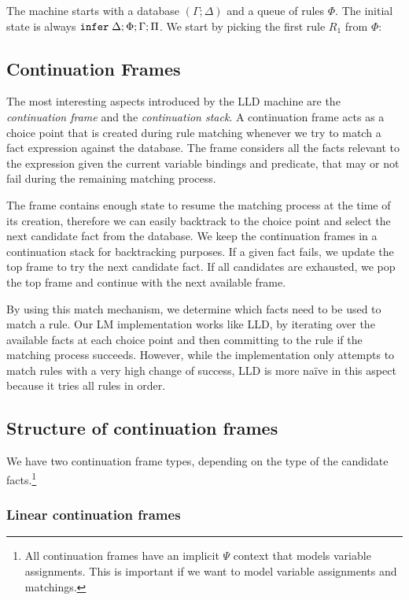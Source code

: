 The machine starts with a database $(\Gamma; \Delta)$ and a queue of rules
$\Phi$. The initial state is always $\mathtt{infer} \; \Delta; \Phi; \Gamma; \Pi$.
We start by picking the first rule $R_1$ from $\Phi$:



\subsection{Continuation Frames}

The most interesting aspects introduced by the LLD machine are the \emph{continuation frame}
and the \emph{continuation stack}. A continuation frame acts as a choice point
that is created during rule matching whenever we try to match a fact expression
against the database.  The frame considers all the facts relevant to the
expression given the current variable bindings and predicate, that may or not
fail during the remaining matching process.

The frame contains enough state to resume the matching process at the time of
its creation, therefore we can easily backtrack to the choice point and select
the next candidate fact from the database.
We keep the continuation frames in a continuation stack for backtracking
purposes. If a given fact fails, we update the top frame to try the next
candidate fact. If all candidates are exhausted, we pop the top frame and
continue with the next available frame.

By using this match mechanism, we determine which facts need to be used to match
a rule.  Our LM implementation works like LLD, by iterating over the available
facts at each choice point and then committing to the rule if the matching
process succeeds. However, while the implementation only attempts to match rules
with a very high change of success, LLD is more na\"{i}ve in this aspect because
it tries all rules in order.


\subsection{Structure of continuation frames}

We have two continuation frame types, depending on the type of the candidate
facts.\footnote{All continuation frames have an implicit $\Psi$ context that
models variable assignments. This is important if we want to model variable
assignments and matchings.}

\subsubsection{Linear continuation frames}

